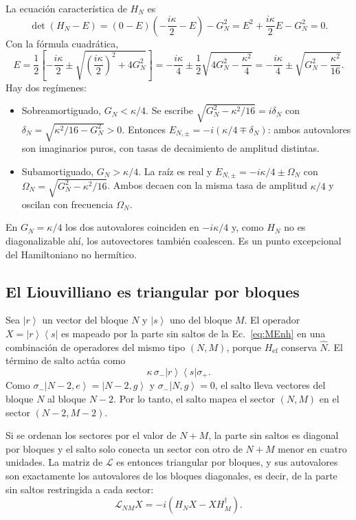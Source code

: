 \documentclass[11pt]{report}
\newcommand{\ket}[1]{\left|#1\right\rangle}
\newcommand{\bra}[1]{\left\langle#1\right|}
\newcommand{\spl}{\sigma_{+}}
\newcommand{\smi}{\sigma_{-}}
\newcommand{\Lv}{\mathcal{L}}
\begin{document}
La ecuaci\'on caracter\'istica de $H_{N}$ es
\begin{equation}
\det(H_{N}-E) = (0-E)\left(-\frac{i\kappa}{2}-E\right) - G_{N}^{2} = E^{2} + \frac{i\kappa}{2}E - G_{N}^{2} = 0 .
\end{equation}
Con la f\'ormula cuadr\'atica,
\begin{equation}
E = \frac{1}{2}\left[-\frac{i\kappa}{2} \pm \sqrt{\left(\frac{i\kappa}{2}\right)^{2} + 4G_{N}^{2}}\right]
= -\frac{i\kappa}{4} \pm \frac{1}{2}\sqrt{4G_{N}^{2}-\frac{\kappa^{2}}{4}}
= -\frac{i\kappa}{4} \pm \sqrt{G_{N}^{2}-\frac{\kappa^{2}}{16}} .
\label{eq:EN}
\end{equation}
Hay dos reg\'imenes:
\begin{itemize}
\item Sobreamortiguado, $G_{N}<\kappa/4$. Se escribe $\sqrt{G_{N}^{2}-\kappa^{2}/16}=i\delta_{N}$ con $\delta_{N}=\sqrt{\kappa^{2}/16-G_{N}^{2}}>0$. Entonces $E_{N,\pm}=-i(\kappa/4\mp\delta_{N})$: ambos autovalores son imaginarios puros, con tasas de decaimiento de amplitud distintas.
\item Subamortiguado, $G_{N}>\kappa/4$. La ra\'iz es real y $E_{N,\pm}=-i\kappa/4 \pm \Omega_{N}$ con $\Omega_{N}=\sqrt{G_{N}^{2}-\kappa^{2}/16}$. Ambos decaen con la misma tasa de amplitud $\kappa/4$ y oscilan con frecuencia $\Omega_{N}$.
\end{itemize}
En $G_{N}=\kappa/4$ los dos autovalores coinciden en $-i\kappa/4$ y, como $H_{N}$ no es diagonalizable ah\'i, los autovectores tambi\'en coalescen. Es un punto excepcional del Hamiltoniano no herm\'itico.

\subsection{El Liouvilliano es triangular por bloques}

Sea $\ket{r}$ un vector del bloque $N$ y $\ket{s}$ uno del bloque $M$. El operador $X=\ket{r}\bra{s}$ es mapeado por la parte sin saltos de la Ec.~\eqref{eq:MEnh} en una combinaci\'on de operadores del mismo tipo $(N,M)$, porque $H_{\mathrm{ef}}$ conserva $\hat N$. El t\'ermino de salto act\'ua como
\begin{equation}
\kappa\,\smi\ket{r}\bra{s}\spl .
\end{equation}
Como $\smi\ket{N-2,e}=\ket{N-2,g}$ y $\smi\ket{N,g}=0$, el salto lleva vectores del bloque $N$ al bloque $N-2$. Por lo tanto, el salto mapea el sector $(N,M)$ en el sector $(N-2,M-2)$.

Si se ordenan los sectores por el valor de $N+M$, la parte sin saltos es diagonal por bloques y el salto solo conecta un sector con otro de $N+M$ menor en cuatro unidades. La matriz de $\Lv$ es entonces triangular por bloques, y sus autovalores son exactamente los autovalores de los bloques diagonales, es decir, de la parte sin saltos restringida a cada sector:
\begin{equation}
\Lv_{NM}X = -i\left(H_{N}X - XH_{M}^{\dagger}\right).
\end{equation}
\end{document}
